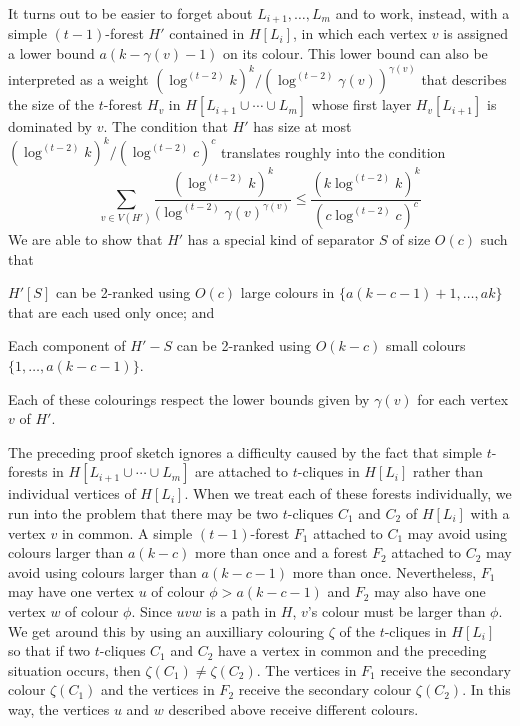 \documentclass[kpfonts]{patmorin}
\theoremstyle{named}
\begin{document}
It turns out to be easier to forget about $L_{i+1},\ldots,L_{m}$ and to work, instead, with a simple $(t-1)$-forest $H'$ contained in $H[L_i]$, in which each vertex $v$ is assigned a lower bound $a(k-\gamma(v)-1)$ on its colour.  This lower bound can also be interpreted as a weight  $(\log^{(t-2)}k)^k/(\log^{(t-2)}\gamma(v))^{\gamma(v)}$ that describes the size of the $t$-forest $H_v$ in $H[L_{i+1}\cup\cdots\cup L_m]$ whose first layer $H_v[L_{i+1}]$ is dominated by $v$.  The condition that $H'$ has size at most $(\log^{(t-2)} k)^k/(\log^{(t-2)} c)^c$ translates roughly into the condition
\[
   \sum_{v\in V(H')}\frac{(\log^{(t-2)}k)^k}{(\log^{(t-2)}\gamma(v)^{\gamma(v)}} \le \frac{(k\log^{(t-2)} k)^k}{(c\log^{(t-2)} c)^c}
\]
We are able to show that $H'$ has a special kind of separator $S$ of size $O(c)$ such that
\begin{compactenum}
    \item $H'[S]$ can be 2-ranked using $O(c)$ large colours in $\{a(k-c-1)+1,\ldots,ak\}$ that are each used only once; and
    \item Each component of $H'-S$ can be 2-ranked using $O(k-c)$ small colours $\{1,\ldots,a(k-c-1)\}$.
\end{compactenum}
Each of these colourings respect the lower bounds given by $\gamma(v)$ for each vertex $v$ of $H'$.

The preceding proof sketch ignores a difficulty caused by the fact that simple $t$-forests in $H[L_{i+1}\cup\cdots\cup L_m]$ are attached to $t$-cliques in $H[L_i]$ rather than individual vertices of $H[L_i]$.  When we treat each of these forests individually, we run into the problem that there may be two $t$-cliques $C_1$ and $C_2$ of $H[L_i]$ with a vertex $v$ in common.  A simple $(t-1)$-forest $F_1$ attached to $C_1$ may avoid using colours larger than $a(k-c)$ more than once and a forest $F_2$ attached to $C_2$ may avoid using colours larger than $a(k-c-1)$ more than once.  Nevertheless, $F_1$ may have one vertex $u$ of colour $\phi >a(k-c-1)$ and $F_2$ may also have one vertex $w$ of colour $\phi$.  Since $uvw$ is a path in $H$, $v$'s colour must be larger than $\phi$.  We get around this by using an auxilliary colouring $\zeta$ of the $t$-cliques in $H[L_i]$ so that if two $t$-cliques $C_1$ and $C_2$ have a vertex in common and the preceding situation occurs, then $\zeta(C_1)\neq \zeta(C_2)$.  The vertices in $F_1$ receive the secondary colour $\zeta(C_1)$ and the vertices in $F_2$ receive the secondary colour $\zeta(C_2)$.  In this way, the vertices $u$ and $w$ described above receive different colours.
\end{document}
